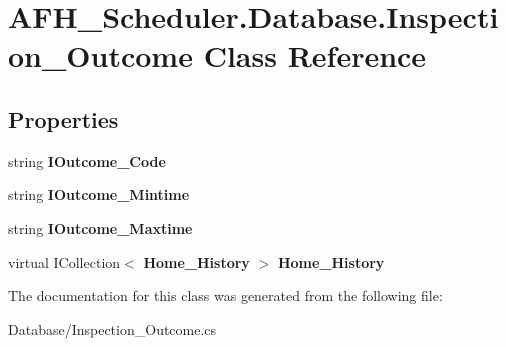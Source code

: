 \section{A\+F\+H\+\_\+\+Scheduler.\+Database.\+Inspection\+\_\+\+Outcome Class Reference}
\label{class_a_f_h___scheduler_1_1_database_1_1_inspection___outcome}
\subsection*{Properties}
\begin{DoxyCompactItemize}
\item 
\mbox{\label{class_a_f_h___scheduler_1_1_database_1_1_inspection___outcome_a331d616a0a671635bfe9514802828b5b}} 
string {\bfseries I\+Outcome\+\_\+\+Code}\hspace{0.3cm}{\ttfamily  [get, set]}
\item 
\mbox{\label{class_a_f_h___scheduler_1_1_database_1_1_inspection___outcome_aa84aedc29017913bd50172bcd5adb489}} 
string {\bfseries I\+Outcome\+\_\+\+Mintime}\hspace{0.3cm}{\ttfamily  [get, set]}
\item 
\mbox{\label{class_a_f_h___scheduler_1_1_database_1_1_inspection___outcome_aa570581d71fee704f9fa630541e8a053}} 
string {\bfseries I\+Outcome\+\_\+\+Maxtime}\hspace{0.3cm}{\ttfamily  [get, set]}
\item 
\mbox{\label{class_a_f_h___scheduler_1_1_database_1_1_inspection___outcome_a548be349930efaf1a7fd579d40abe475}} 
virtual I\+Collection$<$ \textbf{ Home\+\_\+\+History} $>$ {\bfseries Home\+\_\+\+History}\hspace{0.3cm}{\ttfamily  [get, set]}
\end{DoxyCompactItemize}


The documentation for this class was generated from the following file\+:\begin{DoxyCompactItemize}
\item 
Database/Inspection\+\_\+\+Outcome.\+cs\end{DoxyCompactItemize}
